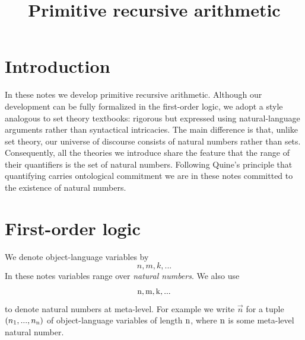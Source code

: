 \documentclass[10pt]{amsart}
\begin{document}
\title{Primitive recursive arithmetic}
\maketitle{}

\section{Introduction}
\noindent
In these notes we develop primitive recursive arithmetic. Although our development can be fully formalized in the first-order logic, we adopt a style analogous to set theory textbooks: rigorous but expressed using natural-language arguments rather than syntactical intricacies. The main difference is that, unlike set theory, our universe of discourse consists of natural numbers rather than sets. Consequently, all the theories we introduce share the feature that the range of their quantifiers is the set of natural numbers. Following Quine’s principle that quantifying carries ontological commitment we are in these notes committed to the existence of natural numbers.

\section{First-order logic}
\noindent
We denote object-language variables by
$$n,m,k,...$$
In these notes variables range over \textit{natural numbers}. We also use
$$\rm{n},\rm{m},\rm{k},...$$
to denote natural numbers at meta-level. For example we write $\vec{n}$ for a tuple $(n_{\rm{1}},...,n_{\rm{n}})$ of object-language variables of length $\rm{n}$, where $\rm{n}$ is some meta-level natural number.
\end{document}
